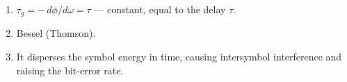 \begin{enumerate}[leftmargin=1.6em,itemsep=2pt]
\item $\tau_g = -\,d\phi/d\omega = \tau$ --- constant, equal to the delay $\tau$.
\item Bessel (Thomson).
\item It disperses the symbol energy in time, causing intersymbol interference and raising the bit-error rate.
\end{enumerate}
